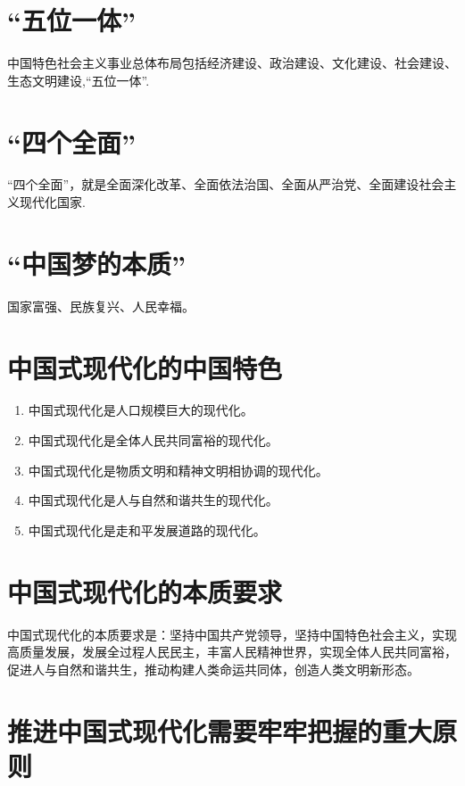 \documentclass[12pt, a4paper, oneside]{ctexbook}
\begin{document}
\section{“五位一体”}

中国特色社会主义事业总体布局包括经济建设、政治建设、文化建设、社会建设、生态文明建设,“五位一体”.

\section{“四个全面”}

“四个全面”，就是全面深化改革、全面依法治国、全面从严治党、全面建设社会主义现代化国家.

\section{“中国梦的本质”}

国家富强、民族复兴、人民幸福。

\section{中国式现代化的中国特色}

\begin{enumerate}
\item 中国式现代化是人口规模巨大的现代化。

\item 中国式现代化是全体人民共同富裕的现代化。

\item 中国式现代化是物质文明和精神文明相协调的现代化。

\item 中国式现代化是人与自然和谐共生的现代化。

\item 中国式现代化是走和平发展道路的现代化。
\end{enumerate}

\section{中国式现代化的本质要求}

中国式现代化的本质要求是：坚持中国共产党领导，坚持中国特色社会主义，实现高质量发展，发展全过程人民民主，丰富人民精神世界，实现全体人民共同富裕，促进人与自然和谐共生，推动构建人类命运共同体，创造人类文明新形态。

\section{推进中国式现代化需要牢牢把握的重大原则}
\end{document}
